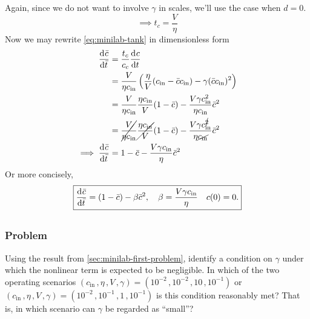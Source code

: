 \documentclass[12pt]{article}
\begin{document}
Again, since we do not want to involve $\gamma$ in scales, we'll use the case
when $d=0$.
\begin{equation*}
  \implies t_c = \frac{V}{\eta}
\end{equation*}
Now we may rewrite \cref{eq:minilab-tank} in dimensionless form
\begin{equation*}
  \begin{aligned}
    \frac{\mathrm{d}^{} {\bar{c}}}{\mathrm{d}{\bar{t}}^{}} &=
    \frac{t_c}{c_c}\frac{\mathrm{d}^{} {c}}{\mathrm{d}{t}^{}} \\
    &= \frac{V}{\eta c_{\text{in}}}
    \left(\frac{\eta}{V}(c_{\text{in}}-\bar{c}c_{\text{in}})-\gamma
    (\bar{c}c_{\text{in}})^2\right) \\
    &= \frac{V}{\eta c_{\text{in}}}\frac{\eta c_{\text{in}}}{V} (1-\bar{c}) -
    \frac{V\gamma c_{\text{in}}^2}{\eta c_{\text{in}}}\bar{c}^2 \\
    &= \cancel{\frac{V}{\eta c_{\text{in}}}} \cancel{\frac{\eta c_{\text{in}}}{V}}
    (1-\bar{c}) -
    \frac{V \gamma c_{\text{in}}^{\cancel{2}}}{\eta \cancel{c_{\text{in}}}}\bar{c}^2 \\
    \implies \frac{\mathrm{d}^{} {\bar{c}}}{\mathrm{d}{\bar{t}}^{}}
    &= 1-\bar{c} - \frac{V \gamma c_{\text{in}}}{\eta}\bar{c}^2 \\
  \end{aligned}
\end{equation*}
Or more concisely,
\begin{equation*} \boxed{
    \frac{\mathrm{d}^{} {\bar{c}}}{\mathrm{d}{\bar{t}}^{}} = (1 - \bar{c}) - \beta\bar{c}^2,
    \quad \beta = \frac{V \gamma c_{\text{in}}}{\eta} \quad c(0)=0.
    }
\end{equation*}

\subsection{}
\label{sec:minilab-second-problem}
\subsubsection*{Problem}
Using the result from \cref{sec:minilab-first-problem}, identify a condition on
$\gamma$ under which the nonlinear term is expected to be negligible. In which
of the two operating scenarios
$(c_{\text{in}}\,,\eta\,,V\,,\gamma) = (10^{-2}\,,10^{-2}\,,10\,,10^{-1})$ or
$(c_{\text{in}}\,,\eta\,,V\,,\gamma) = (10^{-2}\,,10^{-1}\,,1\,,10^{-1})$
is this condition reasonably met? That is, in which scenario can $\gamma$ be
regarded as ``small''?
\end{document}
